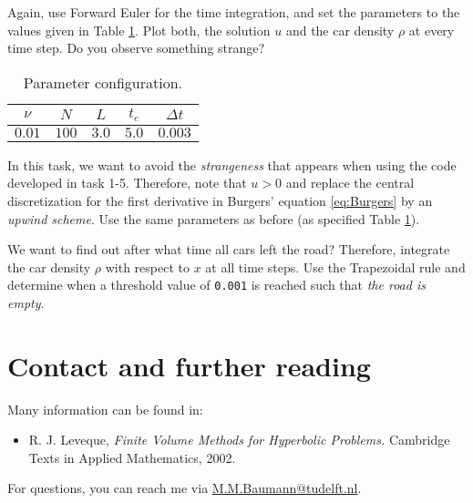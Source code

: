 \documentclass[a4paper,10pt]{article}
\begin{document}
Again, use Forward Euler for the time integration, and set the parameters to the values given in Table \ref{params2}. Plot both, the solution $u$ and the car density $\rho$ at every time step. Do you observe something strange?

\begin{table}[ht]
\centering
 \begin{tabular}{|c|c|c|c|c|}
  \hline
  $\nu$ & $N$ & $L$ & $t_e$ & $\Delta t$\\
  \hline
  $0.01$ & $100$ & $3.0$ & $5.0$ & $0.003$\\
  \hline
 \end{tabular}
\caption{Parameter configuration.}\label{params2}
\end{table}

In this task, we want to avoid the \textit{strangeness} that appears when using the code developed in task 1-5. Therefore, note that $u>0$ and replace the central discretization for the first derivative in Burgers' equation \eqref{eq:Burgers} by an \textit{upwind scheme}. Use the same parameters as before (as specified Table \ref{params2}).

We want to find out after what time all cars left the road? Therefore, integrate the car density $\rho$ with respect to $x$ at all time steps. Use the Trapezoidal rule and determine when a threshold value of \texttt{0.001} is reached such that \textit{the road is empty}.

% 
\section*{Contact and further reading}
Many information can be found in:
\begin{itemize}
 \item R. J. Leveque, \textit{Finite Volume Methods for Hyperbolic Problems.} Cambridge Texts in Applied Mathematics, 2002.
\end{itemize}
For questions, you can reach me via \href{mailto:M.M.Baumann@tudelft.nl}{M.M.Baumann@tudelft.nl}.
\end{document}
